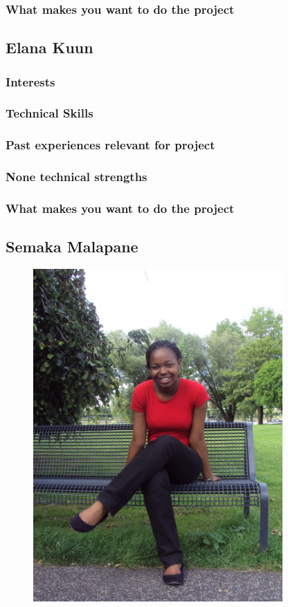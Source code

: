 \documentclass[hidelinks, 12pt, oneside]{article}
\begin{document}
\subsubsection{What makes you want to do the project}

\subsection{Elana Kuun}
\subsubsection{Interests}
\subsubsection{Technical Skills}
\subsubsection{Past experiences relevant for project}
\subsubsection{None technical strengths}
\subsubsection{What makes you want to do the project}

\subsection{Semaka Malapane}

\begin{figure}[h!]
  \centering
    \includegraphics[width=0.85\textwidth]{Semaka} 
\end{figure}
\end{document}
